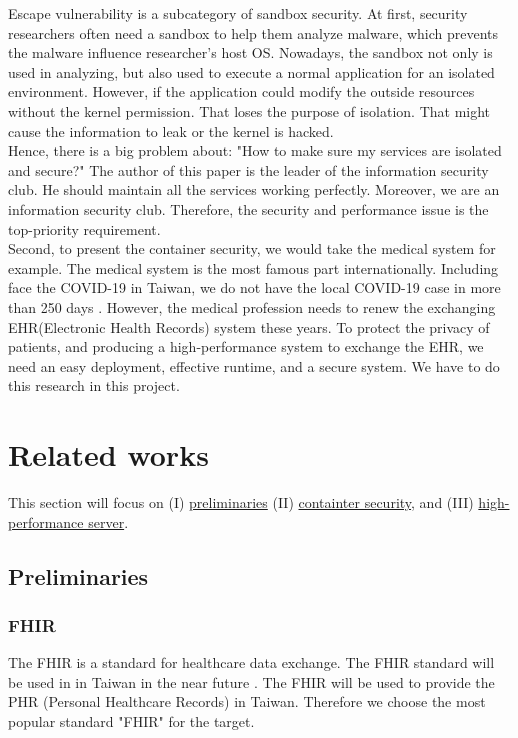 \documentclass[12pt,a4paper]{article}
\begin{document}
Escape vulnerability is a subcategory of sandbox security. At first, security researchers often
need a sandbox to help them analyze malware, which prevents the malware influence researcher's
host OS. Nowadays, the sandbox not only is used in analyzing, but also used to execute a
normal application for an isolated environment. However, if the application could modify the
outside resources without the kernel permission. That loses the purpose of isolation. That
might cause the information to leak or the kernel is hacked.\\

Hence, there is a big problem about: "How to make sure my services are isolated and secure?" The
author of this paper is the leader of the information security club. He should maintain all
the services working perfectly. Moreover, we are an information security club. Therefore,
the security and performance issue is the top-priority requirement.\\

Second, to present the container security, we would take the medical system for
example.
The medical system is the most famous part internationally. Including face the COVID-19
in Taiwan, we do not have the local COVID-19 case in more than 250 days \cite{COVID19_CNN}.
However, the medical profession needs to renew the exchanging EHR(Electronic Health Records)
system these years. To protect the privacy of patients, and producing a high-performance
system to exchange the EHR, we need an easy deployment, effective runtime, and a secure system.
We have to do this research in this project.


\section{Related works}
This section will focus on (\RN{1}) \hyperlink{preliminaries}{preliminaries} (\RN{2}) \hyperlink{security}{containter security}, and (\RN{3})
\hyperlink{heigh_performance}{high-performance server}.

\subsection{Preliminaries}
\hypertarget{preliminaries}{}
\subsubsection{FHIR}
The FHIR is a standard for healthcare data exchange. The FHIR standard will be used in
in Taiwan in the near future \cite{MOHW_FHIR}. The FHIR will be used to provide the PHR
(Personal Healthcare Records) in Taiwan. Therefore we choose the most popular standard
"FHIR" for the target.
\end{document}

